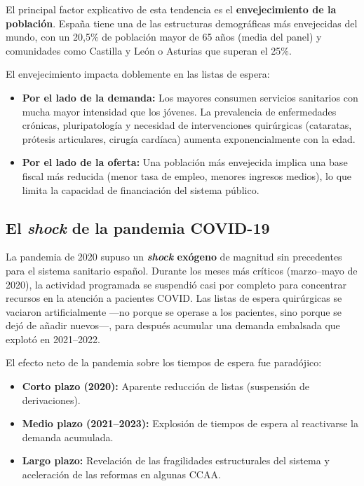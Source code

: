 El principal factor explicativo de esta tendencia es el \textbf{envejecimiento de
la población}. España tiene una de las estructuras demográficas más envejecidas
del mundo, con un 20{,}5\% de población mayor de 65 años (media del panel) y
comunidades como Castilla y León o Asturias que superan el 25\%.

El envejecimiento impacta doblemente en las listas de espera:

\begin{itemize}
  \item \textbf{Por el lado de la demanda:} Los mayores consumen servicios
    sanitarios con mucha mayor intensidad que los jóvenes. La prevalencia de
    enfermedades crónicas, pluripatología y necesidad de intervenciones quirúrgicas
    (cataratas, prótesis articulares, cirugía cardíaca) aumenta exponencialmente
    con la edad.
  \item \textbf{Por el lado de la oferta:} Una población más envejecida implica
    una base fiscal más reducida (menor tasa de empleo, menores ingresos medios),
    lo que limita la capacidad de financiación del sistema público.
\end{itemize}

\subsection{El \textit{shock} de la pandemia COVID-19}

La pandemia de 2020 supuso un \textbf{\textit{shock} exógeno} de magnitud sin
precedentes para el sistema sanitario español. Durante los meses más críticos
(marzo--mayo de 2020), la actividad programada se suspendió casi por completo para
concentrar recursos en la atención a pacientes COVID. Las listas de espera
quirúrgicas se vaciaron artificialmente ---no porque se operase a los pacientes,
sino porque se dejó de añadir nuevos---, para después acumular una demanda
embalsada que explotó en 2021--2022.

El efecto neto de la pandemia sobre los tiempos de espera fue paradójico:

\begin{itemize}
  \item \textbf{Corto plazo (2020):} Aparente reducción de listas (suspensión de
    derivaciones).
  \item \textbf{Medio plazo (2021--2023):} Explosión de tiempos de espera al
    reactivarse la demanda acumulada.
  \item \textbf{Largo plazo:} Revelación de las fragilidades estructurales del
    sistema y aceleración de las reformas en algunas CCAA.
\end{itemize}

